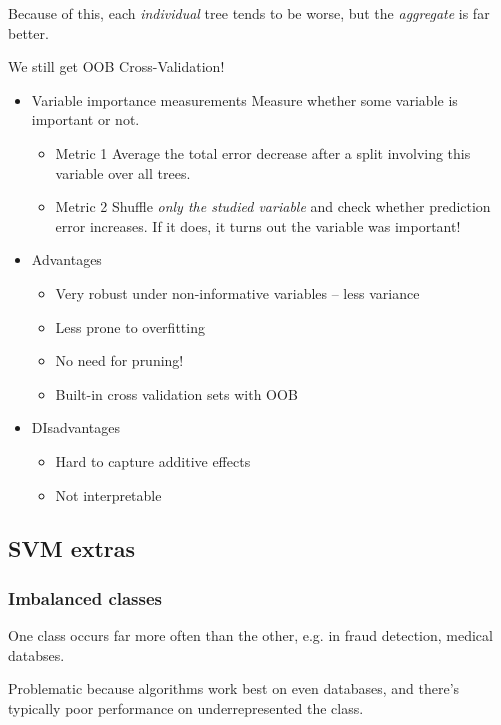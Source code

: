 \documentclass[11pt]{article}
\begin{document}
\begin{itemize}
Because of this, each \emph{individual} tree tends to be worse, but the \emph{aggregate} is far better.

We still get OOB Cross-Validation!
\begin{itemize}
\item Variable importance measurements
\label{sec-5-1-5-1}
Measure whether some variable is important or not.
\begin{itemize}
\item Metric 1
\label{sec-5-1-5-1-1}
Average the total error decrease after a split involving this variable over all trees.
\item Metric 2
\label{sec-5-1-5-1-2}
Shuffle \emph{only the studied variable} and check whether prediction error increases. If it does, it turns out the variable was important!
\end{itemize}
\item Advantages
\label{sec-5-1-5-2}
\begin{itemize}
\item Very robust under non-informative variables -- less variance
\item Less prone to overfitting
\item No need for pruning!
\item Built-in cross validation sets with OOB
\end{itemize}
\item DIsadvantages
\label{sec-5-1-5-3}
\begin{itemize}
\item Hard to capture additive effects
\item Not interpretable
\end{itemize}
\end{itemize}
\subsection{SVM extras}
\label{sec-5-2}
\subsubsection*{Imbalanced classes}
\label{sec-5-2-1}
One class occurs far more often than the other, e.g. in fraud detection, medical databses.

Problematic because algorithms work best on even databases, and there's typically poor performance on underrepresented the class.


\end{itemize}
\end{document}

